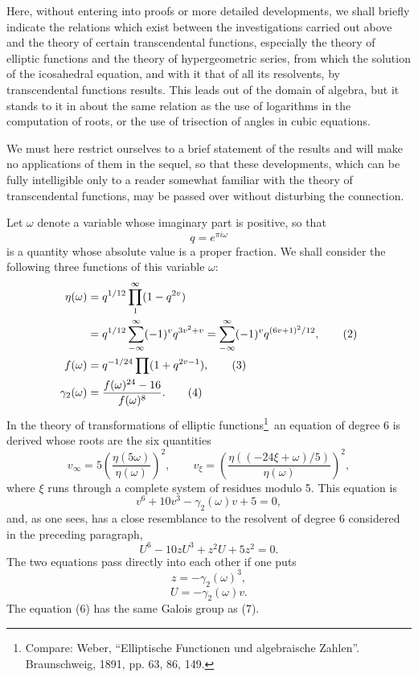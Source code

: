 \documentclass[11pt]{article}
\begin{document}
Here, without entering into proofs or more detailed developments, we shall briefly indicate the relations which exist between the investigations carried out above and the theory of certain transcendental functions, especially the theory of elliptic functions and the theory of hypergeometric series, from which the solution of the icosahedral equation, and with it that of all its resolvents, by transcendental functions results. This leads out of the domain of algebra, but it stands to it in about the same relation as the use of logarithms in the computation of roots, or the use of trisection of angles in cubic equations.

We must here restrict ourselves to a brief statement of the results and will make no applications of them in the sequel, so that these developments, which can be fully intelligible only to a reader somewhat familiar with the theory of transcendental functions, may be passed over without disturbing the connection.

Let \(\omega\) denote a variable whose imaginary part is positive, so that
\begin{equation}
q=e^{\pi i\omega}
\tag{1}
\end{equation}
is a quantity whose absolute value is a proper fraction. We shall consider the following three functions of this variable \(\omega\):
\begin{align}
\eta(\omega)&=q^{1/12}\prod_{1}^{\infty}(1-q^{2v})\notag\\
&=q^{1/12}\sum_{-\infty}^{\infty}(-1)^v q^{3v^2+v}
=\sum_{-\infty}^{\infty}(-1)^v q^{(6v+1)^2/12},\tag{2}\\
f(\omega)&=q^{-1/24}\prod(1+q^{2v-1}),\tag{3}\\
\gamma_2(\omega)&=\frac{f(\omega)^{24}-16}{f(\omega)^8}.\tag{4}
\end{align}
In the theory of transformations of elliptic functions\footnote{Compare: Weber, ``Elliptische Functionen und algebraische Zahlen''. Braunschweig, 1891, pp. 63, 86, 149.}\ an equation of degree 6 is derived whose roots are the six quantities
\begin{equation}
v_\infty=5\left(\frac{\eta(5\omega)}{\eta(\omega)}\right)^2,
\qquad
v_\xi=\left(\frac{\eta((-24\xi+\omega)/5)}{\eta(\omega)}\right)^2,
\tag{5}
\end{equation}
where \(\xi\) runs through a complete system of residues modulo 5. This equation is
\begin{equation}
v^6+10v^3-\gamma_2(\omega)v+5=0,
\tag{6}
\end{equation}
and, as one sees, has a close resemblance to the resolvent of degree 6 considered in the preceding paragraph,
\begin{equation}
U^6-10zU^3+z^2U+5z^2=0.
\tag{7}
\end{equation}
The two equations pass directly into each other if one puts
\begin{equation}
z=-\gamma_2(\omega)^3,
\tag{8}
\end{equation}
\begin{equation}
U=-\gamma_2(\omega)v.
\tag{9}
\end{equation}
The equation (6) has the same Galois group as (7).
\end{document}
